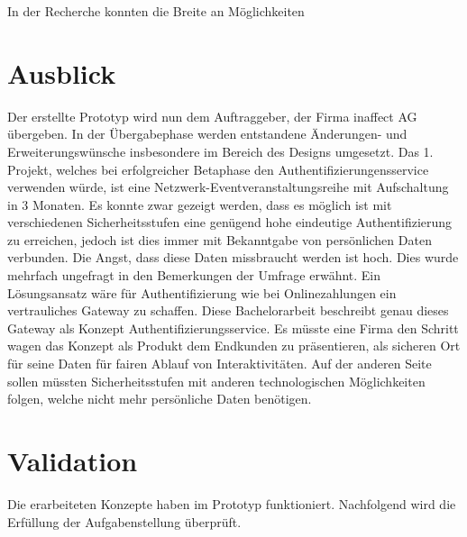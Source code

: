 In der Recherche konnten die Breite an Möglichkeiten

\section{Ausblick}\label{ausblick}

Der erstellte Prototyp wird nun dem Auftraggeber, der Firma inaffect AG
übergeben. In der Übergabephase werden entstandene Änderungen- und
Erweiterungswünsche insbesondere im Bereich des Designs umgesetzt. Das
1. Projekt, welches bei erfolgreicher Betaphase den
Authentifizierungensservice verwenden würde, ist eine
Netzwerk-Eventveranstaltungsreihe mit Aufschaltung in 3 Monaten. Es
konnte zwar gezeigt werden, dass es möglich ist mit verschiedenen
Sicherheitsstufen eine genügend hohe eindeutige Authentifizierung zu
erreichen, jedoch ist dies immer mit Bekanntgabe von persönlichen Daten
verbunden. Die Angst, dass diese Daten missbraucht werden ist hoch. Dies
wurde mehrfach ungefragt in den Bemerkungen der Umfrage erwähnt. Ein
Lösungsansatz wäre für Authentifizierung wie bei Onlinezahlungen ein
vertrauliches Gateway zu schaffen. Diese Bachelorarbeit beschreibt genau
dieses Gateway als Konzept Authentifizierungsservice. Es müsste eine
Firma den Schritt wagen das Konzept als Produkt dem Endkunden zu
präsentieren, als sicheren Ort für seine Daten für fairen Ablauf von
Interaktivitäten. Auf der anderen Seite sollen müssten Sicherheitsstufen
mit anderen technologischen Möglichkeiten folgen, welche nicht mehr
persönliche Daten benötigen.

\newpage

\section{Validation}\label{validation}

Die erarbeiteten Konzepte haben im Prototyp funktioniert. Nachfolgend
wird die Erfüllung der Aufgabenstellung überprüft.

